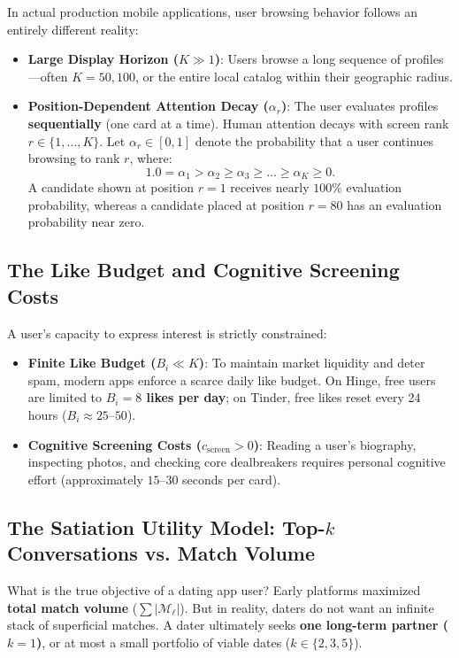 \documentclass[11pt,letterpaper]{article}
\theoremstyle{definition}
\theoremstyle{plain}
\theoremstyle{remark}
\begin{document}
In actual production mobile applications, user browsing behavior follows an entirely different reality:
\begin{itemize}[leftmargin=2em]
    \item \textbf{Large Display Horizon ($K \gg 1$)}: Users browse a long sequence of profiles---often $K = 50, 100$, or the entire local catalog within their geographic radius.
    \item \textbf{Position-Dependent Attention Decay ($\alpha_r$)}: The user evaluates profiles \textbf{sequentially} (one card at a time). Human attention decays with screen rank $r \in \{1, \dots, K\}$. Let $\alpha_r \in [0, 1]$ denote the probability that a user continues browsing to rank $r$, where:
    \[
        1.0 = \alpha_1 > \alpha_2 \ge \alpha_3 \ge \dots \ge \alpha_K \ge 0.
    \]
    A candidate shown at position $r=1$ receives nearly $100\%$ evaluation probability, whereas a candidate placed at position $r=80$ has an evaluation probability near zero.
\end{itemize}

\subsection{The Like Budget and Cognitive Screening Costs}
A user's capacity to express interest is strictly constrained:
\begin{itemize}[leftmargin=2em]
    \item \textbf{Finite Like Budget ($B_i \ll K$)}: To maintain market liquidity and deter spam, modern apps enforce a scarce daily like budget. On Hinge, free users are limited to \textbf{$B_i = 8$ likes per day}; on Tinder, free likes reset every 24 hours ($B_i \approx 25\text{--}50$).
    \item \textbf{Cognitive Screening Costs ($c_{\text{screen}} > 0$)}: Reading a user's biography, inspecting photos, and checking core dealbreakers requires personal cognitive effort (approximately $15\text{--}30$ seconds per card).
\end{itemize}

\subsection{The Satiation Utility Model: Top-$k$ Conversations vs. Match Volume}
What is the true objective of a dating app user? 
Early platforms maximized \textbf{total match volume} ($\sum |\mathcal{M}_\ell|$). But in reality, daters do not want an infinite stack of superficial matches. A dater ultimately seeks \textbf{one long-term partner ($k=1$)}, or at most a small portfolio of viable dates ($k \in \{2, 3, 5\}$).
\end{document}
